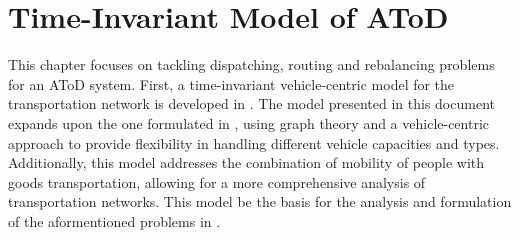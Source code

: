 \chapter{Time-Invariant Model of AToD}
This chapter focuses on tackling dispatching, routing and rebalancing problems for an AToD system. First, a time-invariant vehicle-centric model for the transportation network is developed in . The model presented in this document expands upon the one formulated in \cite{project_thesis}, using graph theory and a vehicle-centric approach to provide flexibility in handling different vehicle capacities and types. Additionally, this model addresses the combination of mobility of people with goods transportation, allowing for a more comprehensive analysis of transportation networks. This model be the basis for the analysis and formulation of the aformentioned problems in . 
